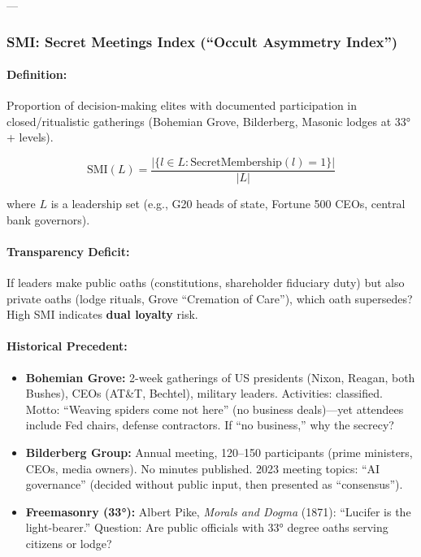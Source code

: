 \documentclass[11pt,a4paper]{article}
\theoremstyle{definition}
\theoremstyle{remark}
\begin{document}
---

\subsubsection{SMI: Secret Meetings Index (``Occult Asymmetry Index'')}

\paragraph{Definition:}
Proportion of decision-making elites with documented participation in closed/ritualistic gatherings (Bohemian Grove, Bilderberg, Masonic lodges at 33°+ levels).

\[
\text{SMI}(L) = \frac{|\{l \in L : \text{SecretMembership}(l) = 1\}|}{|L|}
\]

where $L$ is a leadership set (e.g., G20 heads of state, Fortune 500 CEOs, central bank governors).

\paragraph{Transparency Deficit:}
If leaders make public oaths (constitutions, shareholder fiduciary duty) but also private oaths (lodge rituals, Grove ``Cremation of Care''), which oath supersedes? High SMI indicates \textbf{dual loyalty} risk.

\paragraph{Historical Precedent:}
\begin{itemize}
\item \textbf{Bohemian Grove:} 2-week gatherings of US presidents (Nixon, Reagan, both Bushes), CEOs (AT\&T, Bechtel), military leaders. Activities: classified. Motto: ``Weaving spiders come not here'' (no business deals)—yet attendees include Fed chairs, defense contractors. If ``no business,'' why the secrecy?
\item \textbf{Bilderberg Group:} Annual meeting, 120–150 participants (prime ministers, CEOs, media owners). No minutes published. 2023 meeting topics: ``AI governance'' (decided without public input, then presented as ``consensus'').
\item \textbf{Freemasonry (33°):} Albert Pike, \textit{Morals and Dogma} (1871): ``Lucifer is the light-bearer.'' Question: Are public officials with 33° degree oaths serving citizens or lodge?
\end{itemize}
\end{document}

